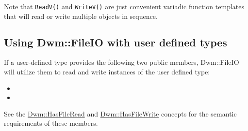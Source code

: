 \begin{minipage}{\textwidth}
Note that \texttt{ReadV()} and \texttt{WriteV()} are just convenient
variadic function templates that will read or write multiple objects
in sequence.
\vspace{1ex}

\subsection{Using {\ttfamily Dwm::FileIO} with user defined types}
If a user-defined type provides the following two public members,
{\ttfamily Dwm::FileIO} will utilize them to read and write instances
of the user defined type:
\vspace{1ex}

\begin{itemize}[noitemsep,nolistsep]
\item[] 
\item[] 
\end{itemize}
\vspace{1ex}

See the \hyperlink{concept:HasFileRead}{\ttfamily Dwm::HasFileRead} and
\hyperlink{concept:HasFileWrite}{\ttfamily Dwm::HasFileWrite} concepts for
the semantic requirements of these members.
\end{minipage}


